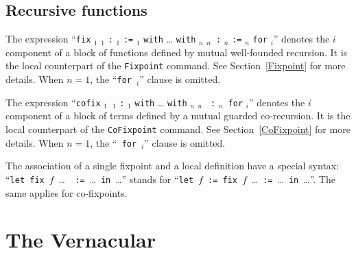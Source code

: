 
\subsection{Recursive functions
\label{fixpoints}
}

The expression ``{\tt fix} \ident$_1$ \binder$_1$ {\tt :} {\type$_1$}
\texttt{:=} \term$_1$ {\tt with} {\ldots} {\tt with} \ident$_n$
\binder$_n$~{\tt :} {\type$_n$} \texttt{:=} \term$_n$ {\tt for}
{\ident$_i$}'' denotes the $i$\nth component of a block of functions
defined by mutual well-founded recursion. It is the local counterpart
of the {\tt Fixpoint} command. See Section~\ref{Fixpoint} for more
details. When $n=1$, the ``{\tt for}~{\ident$_i$}'' clause is omitted.

The expression ``{\tt cofix} \ident$_1$~\binder$_1$ {\tt :}
{\type$_1$} {\tt with} {\ldots} {\tt with} \ident$_n$ \binder$_n$ {\tt
:} {\type$_n$}~{\tt for} {\ident$_i$}'' denotes the $i$\nth component of
a block of terms defined by a mutual guarded co-recursion. It is the
local counterpart of the {\tt CoFixpoint} command. See
Section~\ref{CoFixpoint} for more details. When $n=1$, the ``{\tt
for}~{\ident$_i$}'' clause is omitted.

The association of a single fixpoint and a local
definition have a special syntax: ``{\tt let fix}~$f$~{\ldots}~{\tt
  :=}~{\ldots}~{\tt in}~{\ldots}'' stands for ``{\tt let}~$f$~{\tt :=
  fix}~$f$~\ldots~{\tt :=}~{\ldots}~{\tt in}~{\ldots}''. The same
  applies for co-fixpoints.


\section{The Vernacular
\label{Vernacular}}

